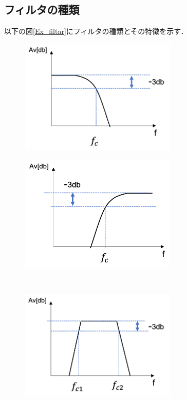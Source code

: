 \documentclass[a4paper,11pt]{jsarticle}
\begin{document}
\subsection{フィルタの種類}
以下の図\ref{Ex_filtar}にフィルタの種類とその特徴を示す．
\begin{figure}[H]
  \begin{minipage}{0.48\textwidth}
    \begin{center}
      \includegraphics[clip,width=7.5cm]{picture/E_LPF.png}
    \end{center}
    \label{Ex_LPF}
  \end{minipage}
  \begin{minipage}{0.48\textwidth}
    \begin{center}
      \includegraphics[clip,width=7.5cm]{picture/E_HPF.png}
    \end{center}
    \label{Ex_HPF}
  \end{minipage} \\
  \begin{minipage}{0.48\textwidth}
    \begin{center}
      \includegraphics[clip,width=7.5cm]{picture/E_BPF.png}

\end{center}
\end{minipage}
\end{figure}
\end{document}
